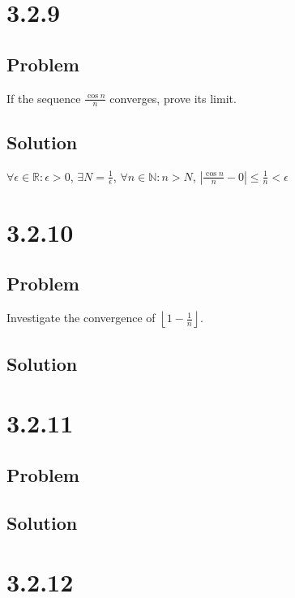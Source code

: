\documentclass[12pt]{article}
\newcommand{\abs}  [1]{\left|       #1 \right|      }
\newcommand{\floor}[1]{\left\lfloor #1 \right\rfloor}
\newcommand{\R}    [0]{\mathbb{R}                   }
\newcommand{\N}    [0]{\mathbb{N}                   }
\begin{document}
\section*{3.2.9}

\subsection*{Problem}
If the sequence $\frac{\cos n}{n}$ converges, prove its limit.

\subsection*{Solution}
$\forall \epsilon \in \R : \epsilon > 0$, $\exists N = \frac{1}{\epsilon}$, $\forall n \in \N : n > N$, $\abs{\frac{\cos n}{n} - 0} \leq \frac{1}{n} < \epsilon$



\section*{3.2.10}

\subsection*{Problem}
Investigate the convergence of $\floor{1 - \frac{1}{n}}$.

\subsection*{Solution}



\section*{3.2.11}

\subsection*{Problem}

\subsection*{Solution}



\section*{3.2.12}
\end{document}

